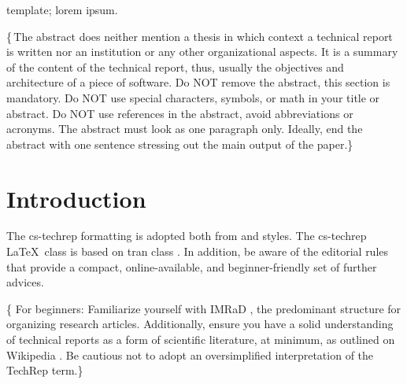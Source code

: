\documentclass[conference,a4paper,flushend]{cs-techrep} %
\begin{document}
\selectlanguage{\cstechrepLang}

\maketitle

\begin{abstract}
This paper demonstrates an example of a technical report in computer science or software engineering, based on the \texttt{cs-techrep} LaTeX class.
The example is intended for beginners, e.\,g., undergraduate students.
It contains a basic outline template and usually fills it with dummy text, but some sections are describing the intent of the outline template and its sections.
Graphic exclamation marks highlight important remarks.
\end{abstract}

\begin{IEEEkeywords}
template; lorem ipsum.
\end{IEEEkeywords}

\{\,\faWarning{}The abstract does neither mention a thesis in which context a technical report is written nor an institution or any other organizational aspects.
It is a summary of the content of the technical report, thus, usually the objectives and architecture of a piece of software.
Do NOT remove the abstract, this section is mandatory.
Do NOT use special characters, symbols, or math in your title or abstract.
Do NOT use references in the abstract, avoid abbreviations or acronyms.
The abstract must look as one paragraph only.
Ideally, end the abstract with one sentence stressing out the main output of the paper.\}

\section{Introduction}

The cs-techrep formatting is adopted both from  \cite{ieee2018formattingrules} and  \cite{iaria2014formattingrules} styles.
The cs-techrep \LaTeX\ class is based on tran class \cite{ieee2015howto}.
In addition, be aware of the \faWarning{}  editorial rules \cite{iaria2009editorialrules} that provide a compact, online-available, and beginner-friendly set of further advices.

\{\faWarning{} For beginners:
Familiarize yourself with IMRaD \cite{elsevier-imrad}, the predominant structure for organizing research articles.
Additionally, ensure you have a solid understanding of technical reports as a form of scientific literature,
at minimum, as outlined on Wikipedia \cite{wiki:techrep}.
Be cautious not to adopt an oversimplified interpretation of the TechRep term.\}
\end{document}
